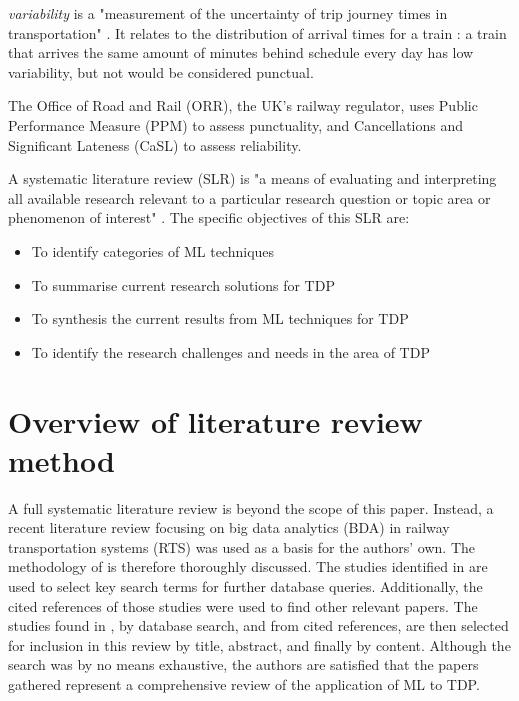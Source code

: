 \documentclass{article}
\begin{document}
\textit{variability} is a "measurement of the uncertainty of trip journey times in transportation" \cite{olsson_haugland_2004}. It relates to the distribution of arrival times for a train \cite{noland_polak_2002}:
a train that arrives the same amount of minutes behind schedule every day has low variability, but not would be considered punctual.

The Office of Road and Rail (ORR), the UK's railway regulator, uses Public Performance Measure (PPM) to assess punctuality, and Cancellations and Significant Lateness (CaSL) to assess reliability.

A systematic literature review (SLR) is "a means of evaluating and interpreting all available research relevant to a particular research question or topic area or phenomenon of interest" \cite{williams_hollingsworth_2005}. The specific objectives of this SLR are:

\begin{itemize}
	\item To identify categories of ML techniques
	\item To summarise current research solutions for TDP
	\item To synthesis the current results from ML techniques for TDP
	\item To identify the research challenges and needs in the area of TDP
\end{itemize}

\clearpage
\section{Overview of literature review\\method}

A full systematic literature review is beyond the scope of this paper. 
Instead, a recent literature review focusing on big data analytics (BDA) in railway transportation systems (RTS) \cite{ghofrani_et_al_2018} was used as a basis for the authors' own.
The methodology of \cite{ghofrani_et_al_2018} is therefore thoroughly discussed. 
The studies identified in \cite{ghofrani_et_al_2018} are used to select key search terms for further database queries. Additionally, the cited references of those studies were used to find other relevant papers.
The studies found in \cite{ghofrani_et_al_2018}, by database search, and from cited references, are then selected for inclusion in this review by title, abstract, and finally by content.
Although the search was by no means exhaustive, the authors are satisfied that the papers gathered represent a comprehensive review of the application of ML to TDP.
\end{document}
